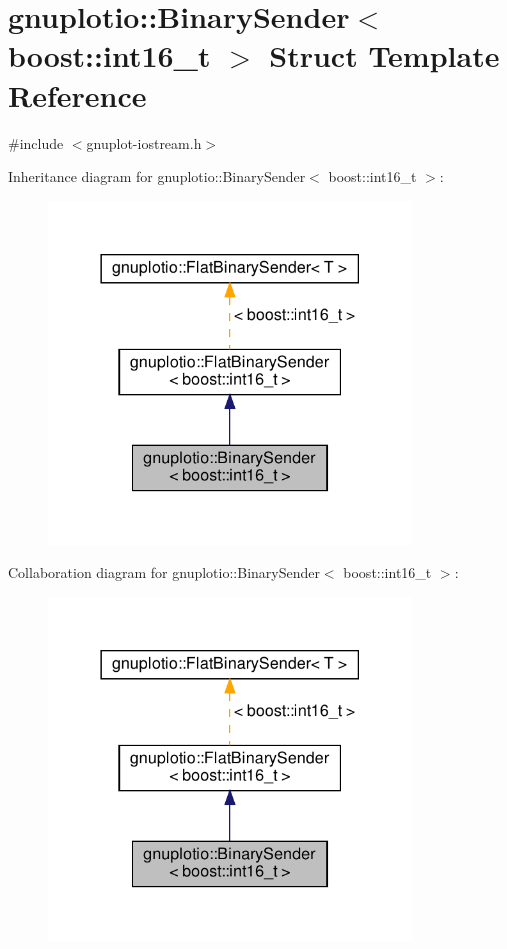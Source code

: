 \hypertarget{structgnuplotio_1_1_binary_sender_3_01boost_1_1int16__t_01_4}{}\section{gnuplotio\+:\+:Binary\+Sender$<$ boost\+:\+:int16\+\_\+t $>$ Struct Template Reference}
\label{structgnuplotio_1_1_binary_sender_3_01boost_1_1int16__t_01_4}


{\ttfamily \#include $<$gnuplot-\/iostream.\+h$>$}



Inheritance diagram for gnuplotio\+:\+:Binary\+Sender$<$ boost\+:\+:int16\+\_\+t $>$\+:
\nopagebreak
\begin{figure}[H]
\begin{center}
\leavevmode
\includegraphics[width=273pt]{structgnuplotio_1_1_binary_sender_3_01boost_1_1int16__t_01_4__inherit__graph}
\end{center}
\end{figure}


Collaboration diagram for gnuplotio\+:\+:Binary\+Sender$<$ boost\+:\+:int16\+\_\+t $>$\+:
\nopagebreak
\begin{figure}[H]
\begin{center}
\leavevmode
\includegraphics[width=273pt]{structgnuplotio_1_1_binary_sender_3_01boost_1_1int16__t_01_4__coll__graph}
\end{center}
\end{figure}

